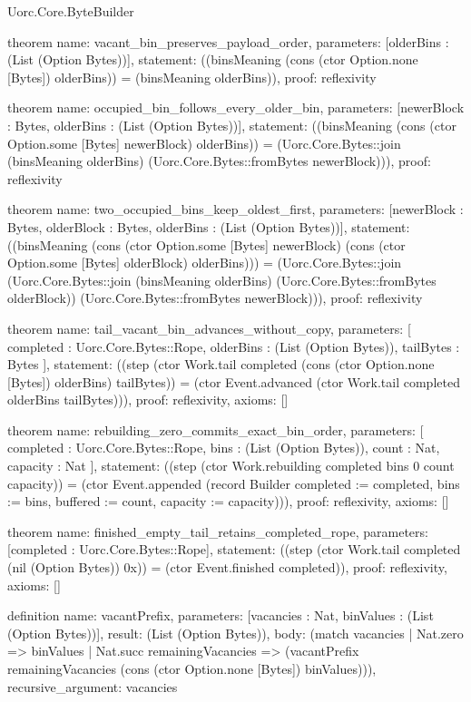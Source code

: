 \begin{lexlean}{Uorc.Core.ByteBuilder}
\begin{semanticmodule}
theorem{
  name: vacant_bin_preserves_payload_order,
  parameters: [olderBins : (List (Option Bytes))],
  statement: ((binsMeaning (cons (ctor Option.none [Bytes]) olderBins)) = (binsMeaning olderBins)),
  proof: reflexivity{}
}

theorem{
  name: occupied_bin_follows_every_older_bin,
  parameters: [newerBlock : Bytes, olderBins : (List (Option Bytes))],
  statement: ((binsMeaning (cons (ctor Option.some [Bytes] newerBlock) olderBins)) = (Uorc.Core.Bytes::join (binsMeaning olderBins) (Uorc.Core.Bytes::fromBytes newerBlock))),
  proof: reflexivity{}
}

theorem{
  name: two_occupied_bins_keep_oldest_first,
  parameters: [newerBlock : Bytes, olderBlock : Bytes, olderBins : (List (Option Bytes))],
  statement: ((binsMeaning (cons (ctor Option.some [Bytes] newerBlock) (cons (ctor Option.some [Bytes] olderBlock) olderBins))) = (Uorc.Core.Bytes::join (Uorc.Core.Bytes::join (binsMeaning olderBins) (Uorc.Core.Bytes::fromBytes olderBlock)) (Uorc.Core.Bytes::fromBytes newerBlock))),
  proof: reflexivity{}
}

theorem{
  name: tail_vacant_bin_advances_without_copy,
  parameters: [
    completed : Uorc.Core.Bytes::Rope,
    olderBins : (List (Option Bytes)),
    tailBytes : Bytes
  ],
  statement: ((step (ctor Work.tail completed (cons (ctor Option.none [Bytes]) olderBins) tailBytes)) = (ctor Event.advanced (ctor Work.tail completed olderBins tailBytes))),
  proof: reflexivity{},
  axioms: []
}

theorem{
  name: rebuilding_zero_commits_exact_bin_order,
  parameters: [
    completed : Uorc.Core.Bytes::Rope,
    bins : (List (Option Bytes)),
    count : Nat,
    capacity : Nat
  ],
  statement: ((step (ctor Work.rebuilding completed bins 0 count capacity)) = (ctor Event.appended (record Builder {completed := completed, bins := bins, buffered := count, capacity := capacity}))),
  proof: reflexivity{},
  axioms: []
}

theorem{
  name: finished_empty_tail_retains_completed_rope,
  parameters: [completed : Uorc.Core.Bytes::Rope],
  statement: ((step (ctor Work.tail completed (nil (Option Bytes)) 0x)) = (ctor Event.finished completed)),
  proof: reflexivity{},
  axioms: []
}

definition{
  name: vacantPrefix,
  parameters: [vacancies : Nat, binValues : (List (Option Bytes))],
  result: (List (Option Bytes)),
  body: (match vacancies
    | Nat.zero => binValues
    | Nat.succ remainingVacancies => (vacantPrefix remainingVacancies (cons (ctor Option.none [Bytes]) binValues))),
  recursive_argument: vacancies
}


\end{semanticmodule}
\end{lexlean}
